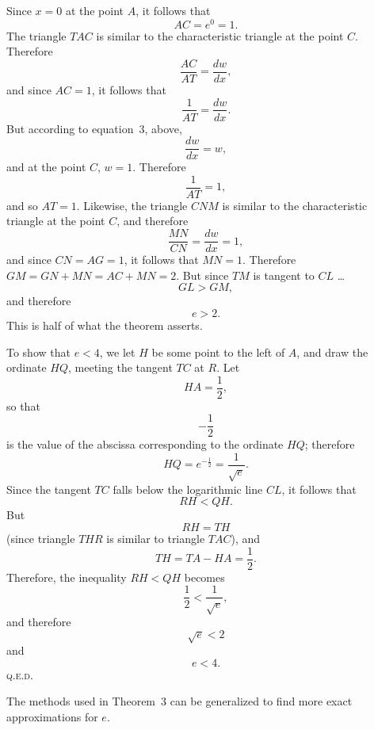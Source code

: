 \documentclass[twoside,openright]{article}
\begin{document}

Since $x=0$ at the point $A$, it follows that 
\[AC = e^0 = 1.\]
The triangle $TAC$ is similar to the characteristic triangle at the point $C$.  Therefore 
\[\frac{AC}{AT} =  \frac{dw}{dx},\]
and since $AC  =1$, it follows that 
\[\frac{1}{AT}= \frac{dw}{dx}.\]
But according to equation~3, above, 
\[\frac{dw}{dx} = w,\]
and at the point $C$, $w=1$.
Therefore 
\[\frac{1}{AT} = 1,\]
and so $AT =1$.
Likewise, the triangle $CNM$ is similar to the characteristic triangle at the point $C$, and therefore
\[\frac{MN}{CN} = \frac{dw}{dx} = 1,\]
and since $CN = AG =1$, it follows that $MN =1$.
Therefore $GM = GN + MN = AC + MN = 2$.  But since $TM$ is tangent to $CL$ \ldots
$$GL > GM,$$
and therefore 
$$e>2.$$  This is half of what the theorem asserts.

To show that $e<4$, we let $H$ be some point to the left of $A$, and draw the ordinate $HQ$, meeting the tangent $TC$ at $R$.    Let 
$$HA = \frac{1}{2},$$ so that 
$$-\frac{1}{2}$$
 is the value of the abscissa corresponding to the ordinate $HQ$; therefore 
$$HQ = e^{-\frac{1}{2}} = \frac{1}{\sqrt{e}}.$$
Since the tangent $TC$ falls below the logarithmic line $CL$, it follows that
$$RH <QH.$$
But 
$$RH = TH$$
(since triangle $THR$ is similar to triangle $TAC$),
and 
$$TH = TA - HA = \frac{1}{2}.$$
Therefore, the inequality $RH < QH$ becomes
$$\frac{1}{2}  < \frac{1}{\sqrt{e}},$$
and therefore
$$\sqrt{e} < 2$$
and 
$$e <4.$$ \textsc{q.e.d.}

The methods used in Theorem~3 can be generalized to find more exact approximations for $e$.


\end{document}
